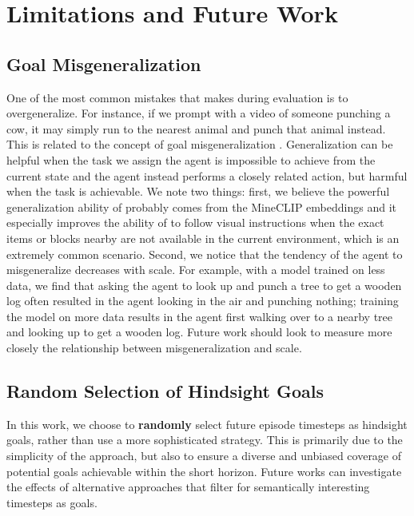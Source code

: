 \section{Limitations and Future Work}
\label{appx:limitations_future}

\subsection{Goal Misgeneralization}
\label{misgeneralization}

One of the most common mistakes that \agentname{} makes during evaluation is to overgeneralize. For instance, if we prompt \agentname{} with a video of someone punching a cow, it may simply run to the nearest animal and punch that animal instead. This is related to the concept of goal misgeneralization \citep{misgeneralization}. Generalization can be helpful when the task we assign the agent is impossible to achieve from the current state and the agent instead performs a closely related action, but harmful when the task is achievable. We note two things: first, we believe the powerful generalization ability of \agentname{} probably comes from the MineCLIP embeddings and it especially improves the ability of \agentname{} to follow visual instructions when the exact items or blocks nearby are not available in the current environment, which is an extremely common scenario. Second, we notice that the tendency of the agent to misgeneralize decreases with scale. For example, with a model trained on less data, we find that asking the agent to look up and punch a tree to get a wooden log often resulted in the agent looking in the air and punching nothing; training the model on more data results in the agent first walking over to a nearby tree and looking up to get a wooden log. Future work should look to measure more closely the relationship between misgeneralization and scale.

\subsection{Random Selection of Hindsight Goals}

In this work, we choose to \textbf{randomly} select future episode timesteps as hindsight goals, rather than use a more sophisticated strategy. This is primarily due to the simplicity of the approach, but also to ensure a diverse and unbiased coverage of potential goals achievable within the short horizon. Future works can investigate the effects of alternative approaches that filter for semantically interesting timesteps as goals.

